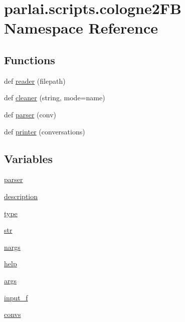 \hypertarget{namespaceparlai_1_1scripts_1_1cologne2FB}{}\section{parlai.\+scripts.\+cologne2\+FB Namespace Reference}
\label{namespaceparlai_1_1scripts_1_1cologne2FB}
\subsection*{Functions}
\begin{DoxyCompactItemize}
\item 
def \hyperlink{namespaceparlai_1_1scripts_1_1cologne2FB_ac3f89c025290a81b76a7573f7c1e5d7a}{reader} (filepath)
\item 
def \hyperlink{namespaceparlai_1_1scripts_1_1cologne2FB_a8a2fb9f6897ef06ab2421d6682dca667}{cleaner} (string, mode=\textquotesingle{}name\textquotesingle{})
\item 
def \hyperlink{namespaceparlai_1_1scripts_1_1cologne2FB_a3d8c5febb71cafe49cc8a5a71c4ba2c5}{parser} (conv)
\item 
def \hyperlink{namespaceparlai_1_1scripts_1_1cologne2FB_a82c4edd06c5b6498faa16f8481278be4}{printer} (conversations)
\end{DoxyCompactItemize}
\subsection*{Variables}
\begin{DoxyCompactItemize}
\item 
\hyperlink{namespaceparlai_1_1scripts_1_1cologne2FB_ae4ca5aa12315e73670c9f97f56d4f355}{parser}
\item 
\hyperlink{namespaceparlai_1_1scripts_1_1cologne2FB_a9df96294db981e8d5f78b55326277cad}{description}
\item 
\hyperlink{namespaceparlai_1_1scripts_1_1cologne2FB_a63548cb270a13793932d035e97e5c85d}{type}
\item 
\hyperlink{namespaceparlai_1_1scripts_1_1cologne2FB_aee25ee82cc84a4eb26e63f3c59013ca4}{str}
\item 
\hyperlink{namespaceparlai_1_1scripts_1_1cologne2FB_a84b7007d3ed49d5b3a17544e5f6fa78e}{nargs}
\item 
\hyperlink{namespaceparlai_1_1scripts_1_1cologne2FB_a90d3d2a21926a8ffe546008550b6249b}{help}
\item 
\hyperlink{namespaceparlai_1_1scripts_1_1cologne2FB_a5f672b8f854fe6a7d69411a32a620f70}{args}
\item 
\hyperlink{namespaceparlai_1_1scripts_1_1cologne2FB_a9fb0e1be0c8c3b931027b2dba74bfa4c}{input\+\_\+f}
\item 
\hyperlink{namespaceparlai_1_1scripts_1_1cologne2FB_a0773b89cd5863668068e995cb88be712}{convs}
\end{DoxyCompactItemize}


